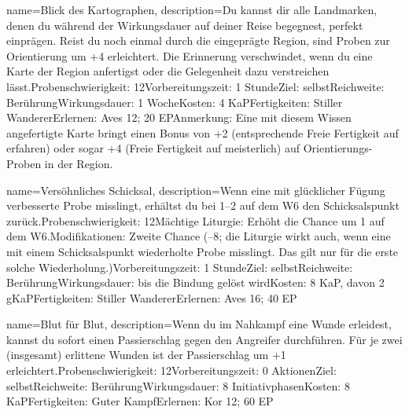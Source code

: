{
    name={Blick des Kartographen},
    description={Du kannst dir alle Landmarken, denen du während der Wirkungsdauer auf deiner Reise begegnest, perfekt einprägen. Reist du noch einmal durch die eingeprägte Region, sind Proben zur Orientierung um +4 erleichtert. Die Erinnerung verschwindet, wenn du eine Karte der Region anfertigst oder die Gelegenheit dazu verstreichen lässt.\newline Probenschwierigkeit: 12\newline Vorbereitungszeit: 1 Stunde\newline Ziel: selbst\newline Reichweite: Berührung\newline Wirkungsdauer: 1 Woche\newline Kosten: 4 KaP\newline Fertigkeiten: Stiller Wanderer\newline Erlernen: Aves 12; 20 EP\newline Anmerkung: Eine mit diesem Wissen angefertigte Karte bringt einen Bonus von +2 (entsprechende Freie Fertigkeit auf erfahren) oder sogar +4 (Freie Fertigkeit auf meisterlich) auf Orientierungs-Proben in der Region.}
}


{
    name={Versöhnliches Schicksal},
    description={Wenn eine mit glücklicher Fügung verbesserte Probe misslingt, erhältst du bei 1–2 auf dem W6 den Schicksalspunkt zurück.\newline Probenschwierigkeit: 12\newline Mächtige Liturgie: Erhöht die Chance um 1 auf dem W6.\newline Modifikationen: Zweite Chance (–8; die Liturgie wirkt auch, wenn eine mit einem Schicksalspunkt wiederholte Probe misslingt. Das gilt nur für die erste solche Wiederholung.)\newline Vorbereitungszeit: 1 Stunde\newline Ziel: selbst\newline Reichweite: Berührung\newline Wirkungsdauer: bis die Bindung gelöst wird\newline Kosten: 8 KaP, davon 2 gKaP\newline Fertigkeiten: Stiller Wanderer\newline Erlernen: Aves 16; 40 EP}
}


{
    name={Blut für Blut},
    description={Wenn du im Nahkampf eine Wunde erleidest, kannst du sofort einen Passierschlag gegen den Angreifer durchführen. Für je zwei (insgesamt) erlittene Wunden ist der Passierschlag um +1 erleichtert.\newline Probenschwierigkeit: 12\newline Vorbereitungszeit: 0 Aktionen\newline Ziel: selbst\newline Reichweite: Berührung\newline Wirkungsdauer: 8 Initiativphasen\newline Kosten: 8 KaP\newline Fertigkeiten: Guter Kampf\newline Erlernen: Kor 12; 60 EP}
}


